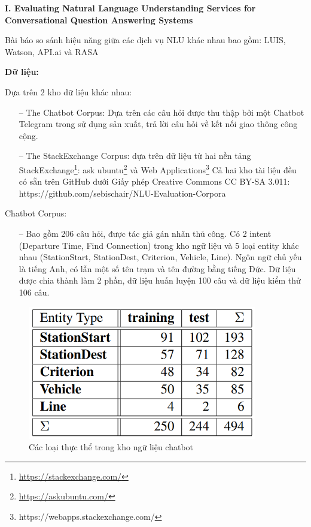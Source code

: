 \textbf{I. Evaluating Natural Language Understanding Services for Conversational Question Answering Systems}

Bài báo so sánh hiệu năng giữa các dịch vụ NLU khác nhau bao gồm: LUIS, Watson, API.ai và RASA

\textbf{Dữ liệu:}

Dựa trên 2 kho dữ liệu khác nhau:
\begin{itemize}
    \item[--] The Chatbot Corpus: Dựa trên các câu hỏi được thu thập bởi một Chatbot Telegram trong sử dụng sản xuất, trả lời câu hỏi về kết nối giao thông công cộng.
    \item[--] The StackExchange Corpus: dựa trên dữ liệu từ hai nền tảng StackExchange\footnote{\url{https://stackexchange.com/}}: ask ubuntu\footnote{\url{https://askubuntu.com/}} và Web Applications\footnote{\url{}https://webapps.stackexchange.com/} Cả hai kho tài liệu đều có sẵn trên GitHub dưới Giấy phép Creative Commons CC BY-SA 3.011: https://github.com/sebischair/NLU-Evaluation-Corpora
\end{itemize}

Chatbot Corpus:

\begin{itemize}
    \item[--] Bao gồm 206 câu hỏi, được tác giả gán nhãn thủ công. Có 2 intent (Departure Time, Find Connection) trong kho ngữ liệu và 5 loại entity khác nhau (StationStart, StationDest, Criterion, Vehicle, Line). Ngôn ngữ chủ yếu là tiếng Anh, có lẫn một số tên trạm và tên đường bằng tiếng Đức. Dữ liệu được chia thành làm 2 phần, dữ liệu huấn luyện 100 câu và dữ liệu kiểm thử 106 câu.
\end{itemize}

\begin{figure}[htp]
    \centering
    \includegraphics[width=10cm]{images/comparisonimg/1.png}
    \caption{Các loại thực thể trong kho ngữ liệu chatbot}
    \label{fig:comparisonimg-1}
\end{figure}

